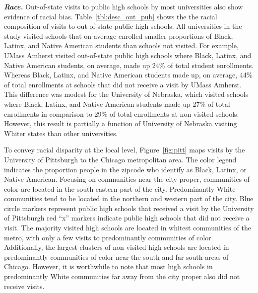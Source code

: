 \documentclass[twoside]{article}
\begin{document}
\textbf{\textit{Race.}} Out-of-state visits to public high schools by most universities also show evidence of racial bias. Table~\ref{tbl:desc_out_pub} shows the the racial composition of visits to out-of-state public high schools. All universities in the study visited schools that on average enrolled smaller proportions of Black, Latinx, and Native American students than schools not visited. For example, UMass Amherst visited out-of-state public high schools where Black, Latinx, and Native American students, on average, made up 24\% of total student enrollments. Whereas Black, Latinx, and Native American students made up, on average, 44\% of total enrollments at schools that did not receive a visit by UMass Amherst. This difference was modest for the University of Nebraska, which visited schools where Black, Latinx, and Native American students made up 27\% of total enrollments in comparison to 29\% of total enrollments at non visited schools. However, this result is partially a function of University of Nebraska visiting Whiter states than other universities.









To convey racial disparity at the local level, Figure~\ref{fig:pitt} maps visits by the University of Pittsburgh to the Chicago metropolitan area.  The color legend indicates the proportion people in the zipcode who identify as Black, Latinx, or Native American. Focusing on communities near the city proper, communities of color are located in the south-eastern part of the city. Predominantly White communities tend to be located in the northern and western part of the city. Blue circle markers represent public high schools that received a visit by the University of Pittsburgh red ``x'' markers indicate public high schools that did not receive a visit. The majority visited high schools are located in whitest communities of the metro, with only a few visits to predominantly communities of color. Additionally, the largest clusters of non visited high schools are located in predominantly communities of color near the south and far south areas of Chicago. However, it is worthwhile to note that most high schools in predominantly White communities far away from the city proper also did not receive visits.
\end{document}
